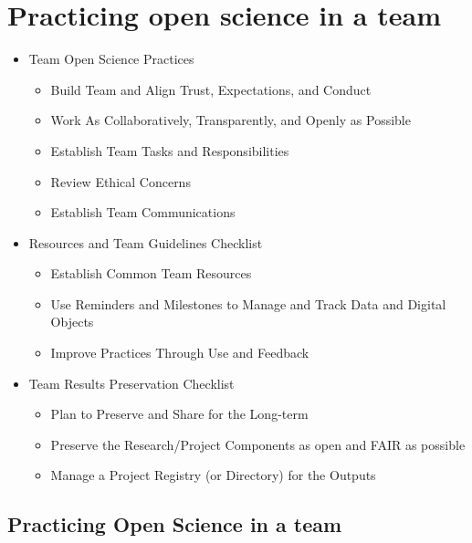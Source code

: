 \documentclass[
  letterpaper,
  DIV=11,
  numbers=noendperiod]{scrreport}
\providecommand{\tightlist}{%
  \setlength{\itemsep}{0pt}\setlength{\parskip}{0pt}}\usepackage{longtable,booktabs,array}
\begin{document}
\hypertarget{practicing-open-science-in-a-team}{%
\chapter{Practicing open science in a
team}\label{practicing-open-science-in-a-team}}

\begin{itemize}
\tightlist
\item
  Team Open Science Practices

  \begin{itemize}
  \tightlist
  \item
    Build Team and Align Trust, Expectations, and Conduct
  \item
    Work As Collaboratively, Transparently, and Openly as Possible
  \item
    Establish Team Tasks and Responsibilities
  \item
    Review Ethical Concerns
  \item
    Establish Team Communications
  \end{itemize}
\item
  Resources and Team Guidelines Checklist

  \begin{itemize}
  \tightlist
  \item
    Establish Common Team Resources
  \item
    Use Reminders and Milestones to Manage and Track Data and Digital
    Objects
  \item
    Improve Practices Through Use and Feedback
  \end{itemize}
\item
  Team Results Preservation Checklist

  \begin{itemize}
  \tightlist
  \item
    Plan to Preserve and Share for the Long-term
  \item
    Preserve the Research/Project Components as open and FAIR as
    possible
  \item
    Manage a Project Registry (or Directory) for the Outputs
  \end{itemize}
\end{itemize}

\hypertarget{practicing-open-science-in-a-team-1}{%
\section{Practicing Open Science in a
team}\label{practicing-open-science-in-a-team-1}}
\end{document}
